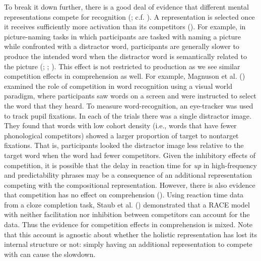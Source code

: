\documentclass[
  12pt,
  letterpaper,
]{scrreprt}
\begin{document}
To break it down further, there is a good deal of evidence that
different mental representations compete for recognition
(; c.f.
).
A representation is selected once it receives sufficiently more
activation than its competitors
(). For example, in picture-naming tasks in which
participants are tasked with naming a picture while confronted with a
distractor word, participants are generally slower to produce the
intended word when the distractor word is semantically related to the
picture
(;
;
). This effect is not restricted to production as we
see similar competition effects in comprehension as well. For example,
Magnuson et al.
() examined
the role of competition in word recognition using a visual world
paradigm, where participants saw words on a screen and were instructed
to select the word that they heard. To measure word-recognition, an
eye-tracker was used to track pupil fixations. In each of the trials
there was a single distractor image. They found that words with low
cohort density (i.e., words that have fewer phonological competitors)
showed a larger proportion of target to nontarget fixations. That is,
participants looked the distractor image less relative to the target
word when the word had fewer competitors. Given the inhibitory effects
of competition, it is possible that the delay in reaction time for
\emph{up} in high-frequency and predictability phrases may be a
consequence of an additional representation competing with the
compositional representation. However, there is also evidence that
competition has no effect on comprehension
().
Using reaction time data from a cloze completion task, Staub et al.
() demonstrated
that a RACE model with neither facilitation nor inhibition between
competitors can account for the data. Thus the evidence for competition
effects in comprehension is mixed. Note that this account is agnostic
about whether the holistic representation has lost its internal
structure or not: simply having an additional representation to compete
with can cause the slowdown.
\end{document}
